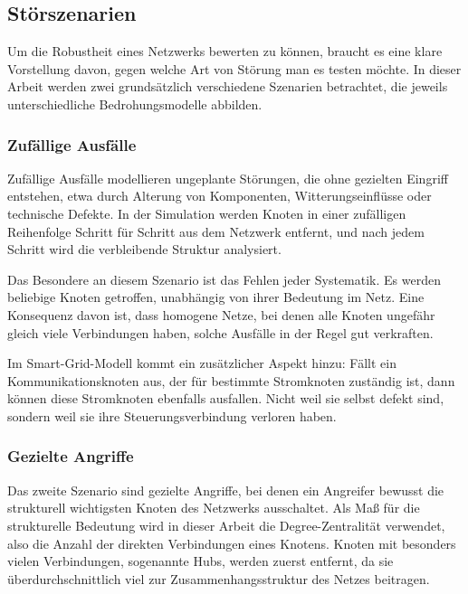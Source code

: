 \subsection{Störszenarien}
\label{sec:stoerszenarien}

Um die Robustheit eines Netzwerks bewerten zu können, braucht es eine klare Vorstellung davon, gegen welche Art von Störung man es testen möchte. In dieser Arbeit werden zwei grundsätzlich verschiedene Szenarien betrachtet, die jeweils unterschiedliche Bedrohungsmodelle abbilden.

\subsubsection{Zufällige Ausfälle}

Zufällige Ausfälle modellieren ungeplante Störungen, die ohne gezielten Eingriff entstehen, etwa durch Alterung von Komponenten, Witterungseinflüsse oder technische Defekte. In der Simulation werden Knoten in einer zufälligen Reihenfolge Schritt für Schritt aus dem Netzwerk entfernt, und nach jedem Schritt wird die verbleibende Struktur analysiert.

Das Besondere an diesem Szenario ist das Fehlen jeder Systematik. Es werden beliebige Knoten getroffen, unabhängig von ihrer Bedeutung im Netz. Eine Konsequenz davon ist, dass homogene Netze, bei denen alle Knoten ungefähr gleich viele Verbindungen haben, solche Ausfälle in der Regel gut verkraften.

Im Smart-Grid-Modell kommt ein zusätzlicher Aspekt hinzu: Fällt ein Kommunikationsknoten aus, der für bestimmte Stromknoten zuständig ist, dann können diese Stromknoten ebenfalls ausfallen. Nicht weil sie selbst defekt sind, sondern weil sie ihre Steuerungsverbindung verloren haben.

\subsubsection{Gezielte Angriffe}

Das zweite Szenario sind gezielte Angriffe, bei denen ein Angreifer bewusst die strukturell wichtigsten Knoten des Netzwerks ausschaltet. Als Maß für die strukturelle Bedeutung wird in dieser Arbeit die Degree-Zentralität verwendet, also die Anzahl der direkten Verbindungen eines Knotens. Knoten mit besonders vielen Verbindungen, sogenannte Hubs, werden zuerst entfernt, da sie überdurchschnittlich viel zur Zusammenhangsstruktur des Netzes beitragen.

